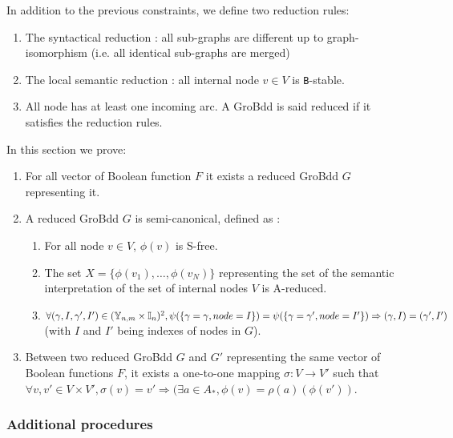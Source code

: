 \documentclass[a4paper,10pt]{article}
\begin{document}
In addition to the previous constraints, we define two reduction rules:\begin{enumerate}
\item The syntactical reduction : all sub-graphs are different up to graph-isomorphism (i.e. all identical sub-graphs are merged)
\item The local semantic reduction : all internal node $v\in V$ is \texttt{B}-stable.
\item All node has at least one incoming arc.
A GroBdd is said reduced if it satisfies the reduction rules.
\end{enumerate}
In this section we prove:\begin{enumerate}
\item For all vector of Boolean function $F$ it exists a reduced GroBdd $G$ representing it.
\item A reduced GroBdd $G$ is semi-canonical, defined as :\begin{enumerate}
\item For all node $v\in V$, $\phi(v)$ is S-free.
\item The set $X = \{\phi(v_1), \dots, \phi(v_N)\}$ representing the set of the semantic interpretation of the set of internal nodes $V$ is A-reduced.
\item $\forall (\gamma, I, \gamma', I') \in (\mathbb{Y}_{n, m} \times \mathbb{I}_n)^2, \psi(\{\gamma = \gamma, node = I\}) = \psi(\{\gamma = \gamma', node = I'\}) \Rightarrow (\gamma, I) = (\gamma', I')$ (with $I$ and $I'$ being indexes of nodes in $G$).
\end{enumerate}
\item Between two reduced GroBdd $G$ and $G'$ representing the same vector of Boolean functions $F$, it exists a one-to-one mapping $\sigma : V \longrightarrow V'$ such that $\forall v, v' \in V \times V', \sigma(v) = v' \Rightarrow (\exists a \in A_{*}, \phi(v) = \rho(a)(\phi(v'))$.
\end{enumerate}

\subsubsection{Additional procedures}
\end{document}
